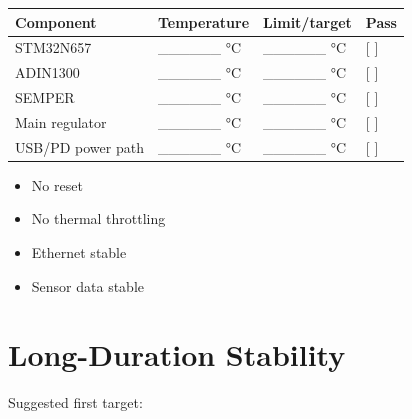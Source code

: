 \documentclass[10pt,a4paper,oneside]{report}
\providecommand{\tightlist}{\setlength{\itemsep}{1pt}\setlength{\parskip}{1pt}}
\begin{document}
{\def\LTcaptype{none} %
\begin{longtable}[]{@{}
  >{\raggedright\arraybackslash}p{}
  >{\raggedleft\arraybackslash}p{}
  >{\raggedleft\arraybackslash}p{}
  >{\centering\arraybackslash}p{}@{}}
\toprule\noalign{}
\begin{minipage}[b]{\linewidth}\raggedright
\textbf{Component}
\end{minipage} & \begin{minipage}[b]{\linewidth}\raggedleft
\textbf{Temperature}
\end{minipage} & \begin{minipage}[b]{\linewidth}\raggedleft
\textbf{Limit/target}
\end{minipage} & \begin{minipage}[b]{\linewidth}\centering
\textbf{Pass}
\end{minipage} \\
\midrule\noalign{}
\endhead
\bottomrule\noalign{}
\endlastfoot
STM32N657 & \_\_\_\_\_\_ °C & \_\_\_\_\_\_ °C & {[} {]} \\
ADIN1300 & \_\_\_\_\_\_ °C & \_\_\_\_\_\_ °C & {[} {]} \\
SEMPER & \_\_\_\_\_\_ °C & \_\_\_\_\_\_ °C & {[} {]} \\
Main regulator & \_\_\_\_\_\_ °C & \_\_\_\_\_\_ °C & {[} {]} \\
USB/PD power path & \_\_\_\_\_\_ °C & \_\_\_\_\_\_ °C & {[} {]} \\
\end{longtable}
}

\begin{itemize}
\tightlist
\item[$\square$]
  No reset
\item[$\square$]
  No thermal throttling
\item[$\square$]
  Ethernet stable
\item[$\square$]
  Sensor data stable
\end{itemize}

\section{Long-Duration Stability}\label{wiki-hardware-bring-up-and-testing--23-long-duration-stability}

Suggested first target:
\end{document}
